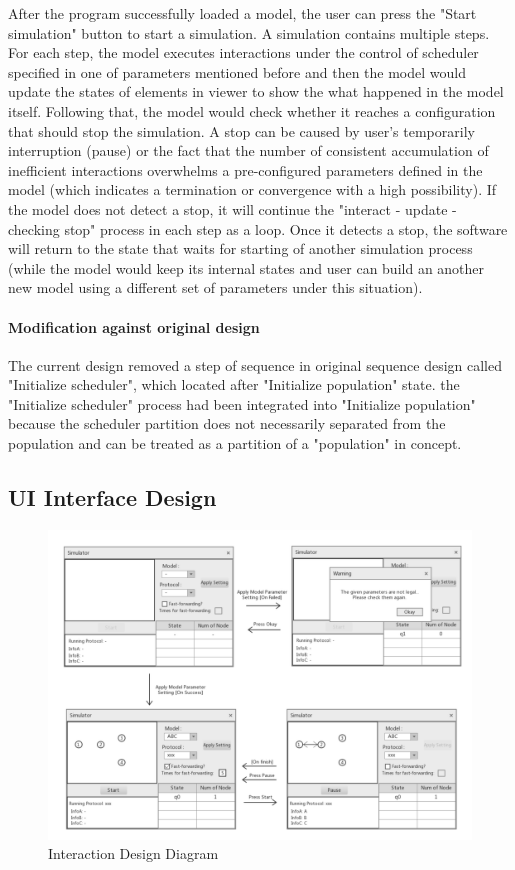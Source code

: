 \par\noindent
After the program successfully loaded a model, the user can press the "Start simulation"
button to start a simulation. A simulation contains multiple steps. For each step,
the model executes interactions under the control of scheduler specified in one
of parameters mentioned before and then the model would update the states of elements
 in viewer to show the what happened in the model itself. Following that, the model would
 check whether it reaches a configuration that should stop the simulation. A stop can be caused
 by user's temporarily interruption (pause) or the fact that the number of consistent accumulation of
 inefficient interactions overwhelms a pre-configured parameters defined in the model (which indicates
 a termination or convergence with a high possibility). If the model does not detect a stop,
 it will continue the "interact - update - checking stop" process in each step as a loop. Once it detects a
 stop, the software will return to the state that waits for starting of another simulation process
 (while the model would keep its internal states and user can build an another new model using a different set of parameters under this situation).

 \paragraph{Modification against original design}
The current design removed a step of sequence in original sequence design called "Initialize scheduler", which located after "Initialize population" state.
the "Initialize scheduler" process had been integrated into "Initialize population" because
the scheduler partition does not necessarily separated from the population and can be treated as a partition of a "population" in concept.

\subsection{UI Interface Design}
\begin{figure}[H]
\begin{center}
\includegraphics[width = \textwidth]{context/diagram/interface.pdf}
\caption{Interaction Design Diagram}
\label{intefaceG}
\end{center}
\end{figure}

